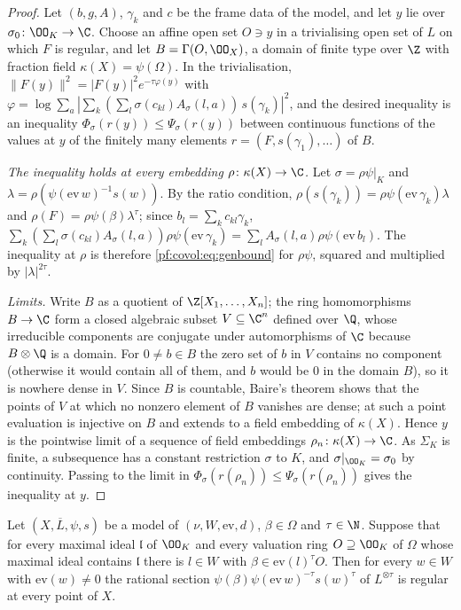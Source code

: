\begin{proof}
Let $(b,g,A)$, $\gamma_k$ and $c$ be the frame data of the model, and let $y$ lie over
$\sigma_0\colon\OO_K\to\C$. Choose an affine open set $O\ni y$ in a trivialising open set of $L$ on which
$F$ is regular, and let $B=\Gamma(O,\OO_X)$, a domain of finite type over $\Z$ with fraction field
$\kappa(X)=\psi(\Omega)$. In the trivialisation, $\|F(y)\|^2=|F(y)|^2e^{-\tau\varphi(y)}$ with
$\varphi=\log\sum_a|\sum_k(\sum_l\sigma(c_{kl})A_\sigma(l,a))\,s(\gamma_k)|^2$, and the desired inequality is
an inequality $\Phi_\sigma(r(y))\le\Psi_\sigma(r(y))$ between continuous functions of the values at $y$ of
the finitely many elements $r=(F,s(\gamma_1),\dots)$ of $B$.

\emph{The inequality holds at every embedding $\rho\colon\kappa(X)\to\C$.} Let $\sigma=\rho\psi|_K$ and
$\lambda=\rho(\psi(\mathrm{ev}\,w)^{-1}s(w))$. By the ratio condition,
$\rho(s(\gamma_k))=\rho\psi(\mathrm{ev}\,\gamma_k)\lambda$ and $\rho(F)=\rho\psi(\beta)\lambda^\tau$; since
$b_l=\sum_kc_{kl}\gamma_k$, $\sum_k(\sum_l\sigma(c_{kl})A_\sigma(l,a))\rho\psi(\mathrm{ev}\,\gamma_k)=
\sum_lA_\sigma(l,a)\rho\psi(\mathrm{ev}\,b_l)$. The inequality at $\rho$ is therefore
\eqref{pf:covol:eq:genbound} for $\rho\psi$, squared and multiplied by $|\lambda|^{2\tau}$.

\emph{Limits.} Write $B$ as a quotient of $\Z[X_1,\dots,X_n]$; the ring homomorphisms $B\to\C$ form a
closed algebraic subset $V\subseteq\C^n$ defined over $\Q$, whose irreducible components are conjugate
under automorphisms of $\C$ because $B\otimes\Q$ is a domain. For $0\ne b\in B$ the zero set of $b$ in $V$
contains no component (otherwise it would contain all of them, and $b$ would be $0$ in the domain $B$),
so it is nowhere dense in $V$. Since $B$ is countable, Baire's theorem shows that the points of $V$ at
which no nonzero element of $B$ vanishes are dense; at such a point evaluation is injective on $B$ and
extends to a field embedding of $\kappa(X)$. Hence $y$ is the pointwise limit of a sequence of field
embeddings $\rho_n\colon\kappa(X)\to\C$. As $\Sigma_K$ is finite, a subsequence has a constant restriction
$\sigma$ to $K$, and $\sigma|_{\OO_K}=\sigma_0$ by continuity. Passing to the limit in
$\Phi_\sigma(r(\rho_n))\le\Psi_\sigma(r(\rho_n))$ gives the inequality at $y$.
\end{proof}

\begin{lemma}[Regularity]\label{pf:covol:lem:regular}
Let $(X,\overline L,\psi,s)$ be a model of $(\nu,W,\mathrm{ev},d)$, $\beta\in\Omega$ and $\tau\in\N$.
Suppose that for every maximal ideal $\mathfrak l$ of $\OO_K$ and every valuation ring $O\supseteq\OO_K$ of
$\Omega$ whose maximal ideal contains $\mathfrak l$ there is $l\in W$ with $\beta\in\mathrm{ev}(l)^\tau O$.
Then for every $w\in W$ with $\mathrm{ev}(w)\ne0$ the rational section
$\psi(\beta)\psi(\mathrm{ev}\,w)^{-\tau}s(w)^\tau$ of $L^{\otimes\tau}$ is regular at every point of $X$.
%
\end{lemma}

